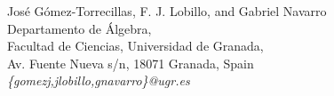 \documentclass[a4paper, 11pt]{article}
\begin{document}


\vspace{0.5cm}


José G\'omez-Torrecillas, F. J. Lobillo, and Gabriel Navarro\\
Departamento de \'Algebra,\\
Facultad de Ciencias,
Universidad de Granada,\\
Av. Fuente Nueva s/n, 18071 Granada, Spain\\
{{\em \{gomezj,jlobillo,gnavarro\}@ugr.es}}
\end{document}
